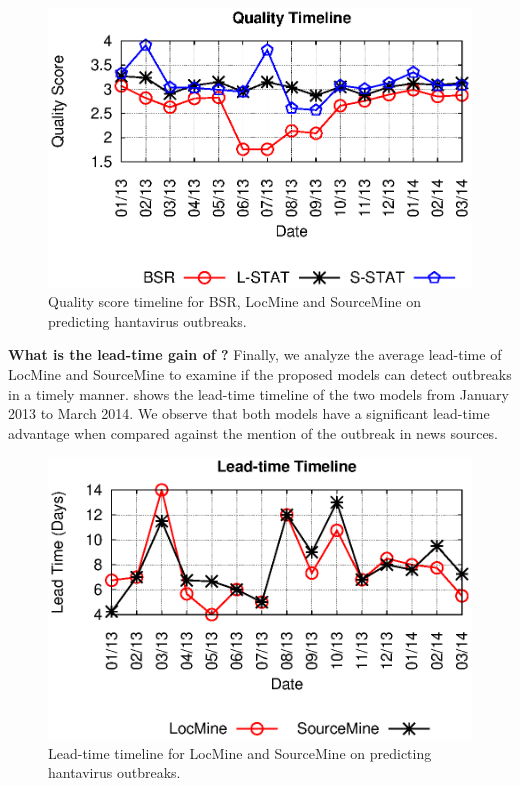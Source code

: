 \documentclass[conference]{IEEEtran}
\newcommand{\fullmodel}{{{\sf SourceMine}}\xspace}
\newcommand{\locationmodel}{{\sf LocMine}\xspace}
\begin{document}
\begin{figure}[h]
\vspace{-10pt}
\begin{center}
	\includegraphics[trim=0 0 0 0, clip,scale=0.5]{fig/quality_timeline.eps}
\end{center}
\caption{Quality score timeline for BSR, \locationmodel and \fullmodel on predicting hantavirus outbreaks.}
 \label{fig:quality_timeline}
\end{figure}

\noindent\textbf{What is the lead-time gain of {}?} Finally, we analyze the average lead-time of \locationmodel and \fullmodel to examine if the proposed models can detect outbreaks in a timely manner.  shows the lead-time timeline of the two models from January 2013 to March 2014. We observe that both models have a significant lead-time advantage when compared against  the mention of the outbreak in news sources.

\begin{figure}[h]
\vspace{-10pt}
\begin{center}
	\includegraphics[trim=0 0 0 0, clip,scale=0.5]{fig/lead_timeline.eps}
\end{center}
\caption{Lead-time timeline for \locationmodel and \fullmodel on predicting hantavirus outbreaks.}
 \label{fig:lead_timeline}
 \vspace{-10pt}
\end{figure}
\end{document}
